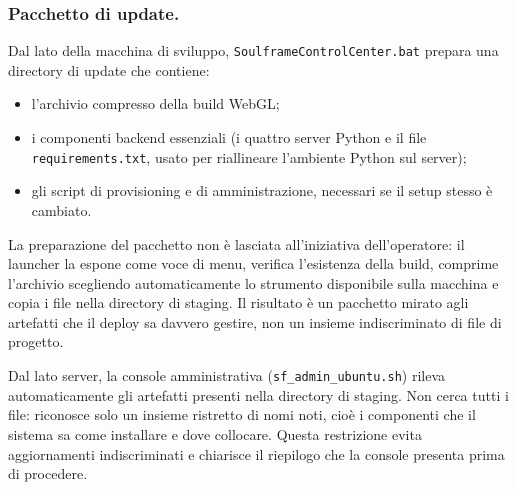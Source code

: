 \subsubsection*{Pacchetto di update.}
Dal lato della macchina di sviluppo, \texttt{SoulframeControlCenter.bat} prepara una directory di update che contiene:
\begin{itemize}
\item l'archivio compresso della build WebGL;
\item i componenti backend essenziali (i quattro server Python e il file \texttt{requirements.txt}, usato per riallineare l'ambiente Python sul server);
\item gli script di provisioning e di amministrazione, necessari se il setup stesso è cambiato.
\end{itemize}

La preparazione del pacchetto non è lasciata all'iniziativa dell'operatore: il launcher la espone come voce di menu, verifica l'esistenza della build, comprime l'archivio scegliendo automaticamente lo strumento disponibile sulla macchina e copia i file nella directory di staging. Il risultato è un pacchetto mirato agli artefatti che il deploy sa davvero gestire, non un insieme indiscriminato di file di progetto.

Dal lato server, la console amministrativa (\texttt{sf\_admin\_ubuntu.sh}) rileva automaticamente gli artefatti presenti nella directory di staging. Non cerca tutti i file: riconosce solo un insieme ristretto di nomi noti, cioè i componenti che il sistema sa come installare e dove collocare. Questa restrizione evita aggiornamenti indiscriminati e chiarisce il riepilogo che la console presenta prima di procedere.


